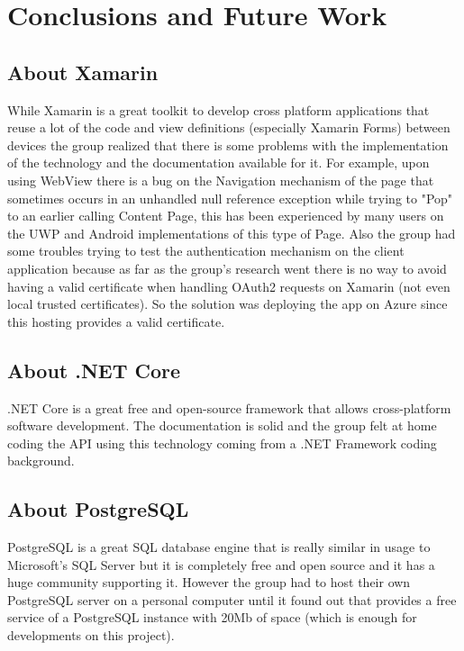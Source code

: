 \chapter{Conclusions and Future Work} 
\label{ch:Chapter8}
\vfill \minitoc \newpage

\section{About Xamarin}

While Xamarin is a great toolkit to develop cross platform applications that reuse a lot of the code and view definitions (especially Xamarin Forms) between devices the group realized that there is some problems with the implementation of the technology and the documentation available for it. 
\newline
For example, upon using WebView there is a bug on the Navigation mechanism of the page that sometimes occurs in an unhandled null reference exception while trying to "Pop" to an earlier calling Content Page, this has been experienced by many users on the UWP and Android implementations of this type of Page.
\newline
Also the group had some troubles trying to test the authentication mechanism on the client application because as far as the group's research went there is no way to avoid having a valid certificate when handling OAuth2 requests on Xamarin (not even local trusted certificates). So the solution was deploying the app on Azure since this hosting provides a valid certificate.


\section{About .NET Core}

.NET Core is a great free and open-source framework that allows cross-platform software development. The documentation is solid and the group felt at home coding the API using this technology coming from a .NET Framework coding background.

\section{About PostgreSQL}
PostgreSQL is a great SQL database engine that is really similar in usage to Microsoft's SQL Server but it is completely free and open source and it has a huge community supporting it. However the group had to host their own PostgreSQL server on a personal computer until it found out that \cite{elephantsql} provides a free service of a PostgreSQL instance with 20Mb of space (which is enough for developments on this project).


